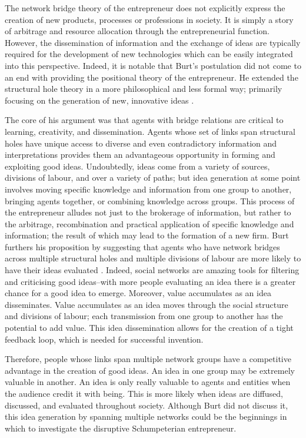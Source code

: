 The network bridge theory of the entrepreneur does not explicitly express the creation of new products, processes or professions in society. It is simply a story of arbitrage and resource allocation through the entrepreneurial function. However, the dissemination of information and the exchange of ideas are typically required for the development of new technologies which can be easily integrated into this perspective. Indeed, it is notable that Burt's postulation did not come to an end with providing the positional theory of the entrepreneur. He extended the structural hole theory in a more philosophical and less formal way; primarily focusing on the generation of new, innovative ideas \citep{Burt2004}.

The core of his argument was that agents with bridge relations are critical to learning, creativity, and dissemination. Agents whose set of links span structural holes have unique access to diverse and even contradictory information and interpretations provides them an advantageous opportunity in forming and exploiting good ideas. Undoubtedly, ideas come from a variety of sources, divisions of labour, and over a variety of paths; but idea generation at some point involves moving specific knowledge and information from one group to another, bringing agents together, or combining knowledge across groups. This process of the entrepreneur alludes not just to the brokerage of information, but rather to the arbitrage, recombination and practical application of specific knowledge and information; the result of which may lead to the formation of a new firm. Burt furthers his proposition by suggesting that agents who have network bridges across multiple structural holes and multiple divisions of labour are more likely to have their ideas evaluated \citep{Burt2005}. Indeed, social networks are amazing tools for filtering and criticising good ideas--with more people evaluating an idea there is a greater chance for a good idea to emerge. Moreover, value accumulates as an idea disseminates. Value accumulates as an idea moves through the social structure and divisions of labour; each transmission from one group to another has the potential to add value. This idea dissemination allows for the creation of a tight feedback loop, which is needed for successful invention.

Therefore, people whose links span multiple network groups have a competitive advantage in the creation of good ideas. An idea in one group may be extremely valuable in another. An idea is only really valuable to agents and entities when the audience credit it with being. This is more likely when ideas are diffused, discussed, and evaluated throughout society. Although Burt did not discuss it, this idea generation by spanning multiple networks could be the beginnings in which to investigate the disruptive Schumpeterian entrepreneur.

